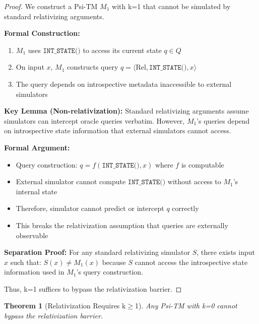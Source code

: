 \documentclass[11pt]{article}
\newtheorem{theorem}{Theorem}
\begin{document}
\begin{proof}
We construct a Psi-TM $M_1$ with k=1 that cannot be simulated by standard relativizing arguments.

\textbf{Formal Construction:}
\begin{enumerate}
\item $M_1$ uses $\texttt{INT\_STATE()}$ to access its current state $q \in Q$
\item On input $x$, $M_1$ constructs query $q = \langle \text{Rel}, \texttt{INT\_STATE()}, x \rangle$
\item The query depends on introspective metadata inaccessible to external simulators
\end{enumerate}

\textbf{Key Lemma (Non-relativization):} Standard relativizing arguments assume simulators can intercept oracle queries verbatim. However, $M_1$'s queries depend on introspective state information that external simulators cannot access.

\textbf{Formal Argument:}
\begin{itemize}
\item Query construction: $q = f(\texttt{INT\_STATE()}, x)$ where $f$ is computable
\item External simulator cannot compute $\texttt{INT\_STATE()}$ without access to $M_1$'s internal state
\item Therefore, simulator cannot predict or intercept $q$ correctly
\item This breaks the relativization assumption that queries are externally observable
\end{itemize}

\textbf{Separation Proof:}
For any standard relativizing simulator $S$, there exists input $x$ such that:
$S(x) \neq M_1(x)$ because $S$ cannot access the introspective state information used in $M_1$'s query construction.

Thus, k=1 suffices to bypass the relativization barrier.
\end{proof}

\begin{theorem}[Relativization Requires k$\geq$1]
\label{thm:relativization-k0}
Any Psi-TM with k=0 cannot bypass the relativization barrier.
\end{theorem}
\end{document}

